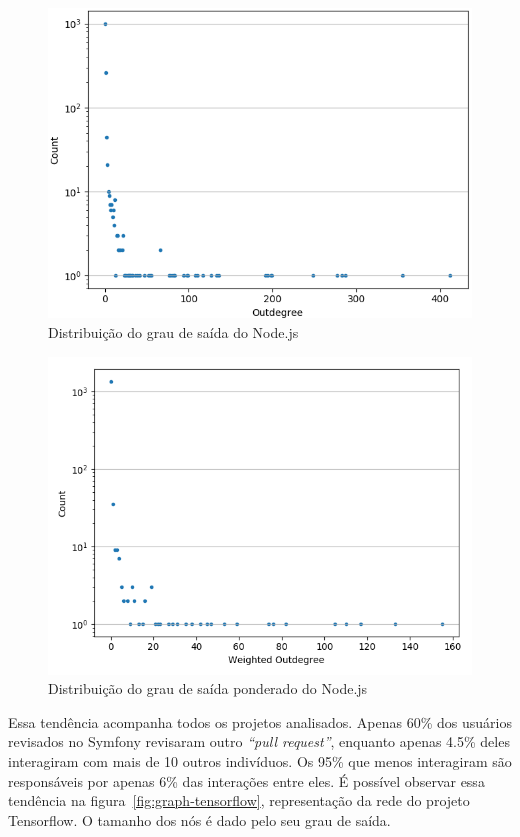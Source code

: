 \documentclass[12pt,openany,oneside,a4paper,english,brazil]{abntbibufjf}
\begin{document}
  \begin{figure}[tbp]
  \centerline{\includegraphics[width=\linewidth]{outdegree}}
  \caption{Distribuição do grau de saída do Node.js}
  \label{fig:outdegree}
  \end{figure}

  \begin{figure}[tbp]
  \centerline{\includegraphics[width=\linewidth]{outdegree-weighted}}
  \caption{Distribuição do grau de saída ponderado do Node.js}
  \label{fig:outdegree-weighted}
  \end{figure}

  Essa tendência acompanha todos os projetos analisados. Apenas 60\% dos usuários revisados no Symfony revisaram outro \textit{``pull request''}, enquanto apenas 4.5\% deles interagiram com mais de 10 outros indivíduos. Os 95\% que menos interagiram são responsáveis por apenas 6\% das interações entre eles. É possível observar essa tendência na figura~\ref{fig:graph-tensorflow}, representação da rede do projeto Tensorflow. O tamanho dos nós é dado pelo seu grau de saída.
\end{document}
